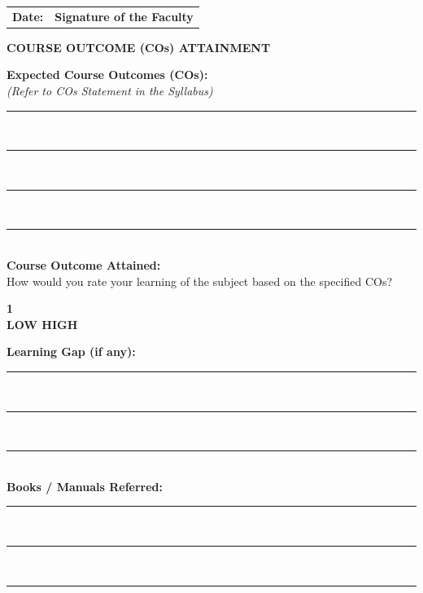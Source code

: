 \documentclass[12pt, a4paper]{report}
\begin{document}
\vspace{3.0cm}
\noindent
\begin{tabular*}{\textwidth}{@{\extracolsep{\fill}}lr}
\textbf{Date:} & \textbf{Signature of the Faculty} \\
\end{tabular*}

\newpage
\thispagestyle{plain}
\begin{center}
    {\Large \textbf{COURSE OUTCOME (COs) ATTAINMENT}}\\[0.8cm]
\end{center}

\noindent
\textbf{Expected Course Outcomes (COs):}\\[0.2cm]
\textit{(Refer to COs Statement in the Syllabus)}\\[0.2cm]
\noindent
\rule{\textwidth}{0.4pt}\\[0.3cm]
\rule{\textwidth}{0.4pt}\\[0.3cm]
\rule{\textwidth}{0.4pt}\\[0.3cm]
\rule{\textwidth}{0.4pt}\\[1.0cm]

\noindent
\textbf{Course Outcome Attained:}\\[0.2cm]
How would you rate your learning of the subject based on the specified COs?\\[0.4cm]
\begin{center}
    \textbf{1         }\\[0.2cm]
    \textbf{LOW \hspace{8cm} HIGH}
\end{center}
\vspace{0.8cm}

\noindent
\textbf{Learning Gap (if any):}\\[0.2cm]
\rule{\textwidth}{0.4pt}\\[0.3cm]
\rule{\textwidth}{0.4pt}\\[0.3cm]
\rule{\textwidth}{0.4pt}\\[1.0cm]

\noindent
\textbf{Books / Manuals Referred:}\\[0.2cm]
\rule{\textwidth}{0.4pt}\\[0.3cm]
\rule{\textwidth}{0.4pt}\\[0.3cm]
\rule{\textwidth}{0.4pt}\\[1.5cm]
\end{document}
